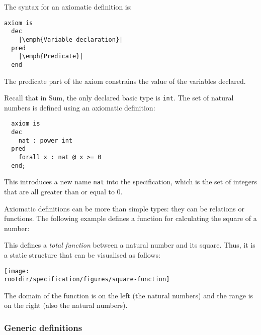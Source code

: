 The syntax for an axiomatic definition is:

\lstset{aboveskip=3mm}
\begin{lstlisting}[escapeinside={||}]
  axiom is
  dec    
    |\emph{Variable declaration}|
  pred
    |\emph{Predicate}|
  end
\end{lstlisting}

The predicate part of the axiom constrains the value of the variables declared.

\begin{example}
Recall that in Sum, the only declared basic type is \texttt{int}. The set of natural numbers is defined using an axiomatic definition:

\lstset{aboveskip=3mm}
\begin{lstlisting}
  axiom is
  dec    
    nat : power int
  pred
    forall x : nat @ x >= 0
  end;
\end{lstlisting}

This introduces a new name \texttt{nat} into the specification, which is the set of integers that are all greater than or equal to 0.

\end{example}

\begin{example}
Axiomatic definitions can be more than simple types: they can be relations or functions. The following example defines a function for calculating the square of a number:



This defines a \emph{total function} between a natural number and its square. Thus, it is a static structure that can be visualised as follows:

\begin{center}
 \texttt{[image: \\rootdir/specification/figures/square-function]}
\end{center}

The domain of the function is on the left (the natural numbers) and the range is on the right (also the natural numbers).

\end{example}

\subsubsection*{Generic definitions}

